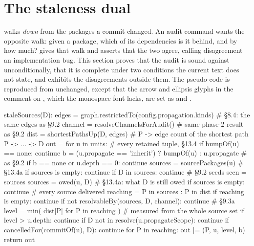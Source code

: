 \section{The staleness dual}
\label{sec:duality}

 walks \emph{down} from the packages a commit changed. An audit
command wants the opposite walk: given a package, which of its dependencies is
it behind, and by how much?  gives that walk and asserts that the
two agree, calling disagreement an implementation bug. This section proves
that the audit is sound against  unconditionally, that it is
complete under two conditions the current text does not state, and exhibits
the disagreements outside them. The pseudo-code is reproduced from
 unchanged, except that the arrow and ellipsis glyphs in the
comment on , which the monospace font lacks, are set as
\code{->} and .

\begin{speccode}[fontsize=\footnotesize]
staleSources(D):
    edges = graph.restrictedTo(config.propagation.kinds)  # §8.4: the same edges as §9.2
    channel = resolveChannelsForAudit()                    # same phase-2 result as §9.2
    dist  = shortestPathsUp(D, edges)   # P -> edge count of the shortest path P -> ... -> D
    out   = {}
    for u in units:                                       # every retained tuple, §13.4
        if bumpOf(u) == none:                             continue
        b = (u.propagate == 'inherit') ? bumpOf(u) : u.propagate    # as §9.2
        if b == none or u.depth == 0:                     continue
        sources = sourcePackages(u)                       # §13.4a
        if sources is empty:                              continue
        if D in sources:                                  continue   # §9.2 seeds seen = sources
        sources = owed(u, D)                              # §13.4a: what D is still owed
        if sources is empty:                              continue   # every source delivered
        reaching = { P in sources : P in dist }
        if reaching is empty:                             continue
        if not resolvableBy(sources, D, channel):     continue   # §9.3a
        level = min({ dist[P] for P in reaching })        # measured from the whole source set
        if level > u.depth:                               continue
        if D not in resolve(u.propagateScope):            continue
        if cancelledFor(commitOf(u), D):                  continue
        for P in reaching:
            out |= { (P, u, level, b) }
    return out
\end{speccode}

